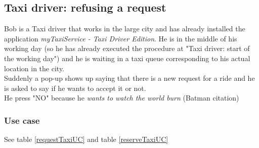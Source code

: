 \subsection{Taxi driver: refusing a request}
Bob is a Taxi driver that works in the large city and has already installed the application \textit{myTaxiService - Taxi Driver Edition}.
He is in the middle of his working day (so he has already executed the procedure at "Taxi driver: start of the working day") and he is waiting in a taxi queue corresponding to his actual location in the city.\\
Suddenly a pop-up shows up saying that there is a new request for a ride and he is asked to say if he wants to accept it or not.\\
He press "NO" because he \textit{wants to watch the world burn} (Batman citation)

\subsubsection{Use case}
See table \ref{requestTaxiUC} and table \ref{reserveTaxiUC}